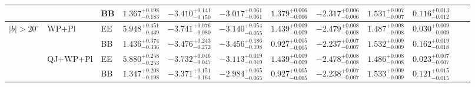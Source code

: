 \begin{table}[h]
\begin{adjustbox}{center}
{\begin{tabular}{llllcccccccc}
 &          & BB & $1.367^{+0.198}_{-0.183}$ & $-3.410^{+0.141}_{-0.150}$ & $-3.017^{+0.061}_{-0.061}$ & $1.379^{+0.006}_{-0.006}$ & $-2.317^{+0.006}_{-0.006}$ & $1.531^{+0.007}_{-0.007}$ & $0.116^{+0.013}_{-0.012}$ \\
\midrule
\multirow{4}{*}{$|b|>20^\circ$}
 & WP+Pl    & EE & $5.948^{+0.451}_{-0.439}$ & $-3.741^{+0.076}_{-0.080}$ & $-3.140^{+0.054}_{-0.055}$ & $1.439^{+0.009}_{-0.009}$ & $-2.479^{+0.008}_{-0.008}$ & $1.487^{+0.008}_{-0.008}$ & $0.030^{+0.009}_{-0.009}$ \\
 &          & BB & $1.436^{+0.374}_{-0.336}$ & $-3.476^{+0.243}_{-0.272}$ & $-3.456^{+0.186}_{-0.198}$ & $0.927^{+0.005}_{-0.005}$ & $-2.237^{+0.007}_{-0.007}$ & $1.532^{+0.009}_{-0.009}$ & $0.162^{+0.019}_{-0.018}$ \\
 & QJ+WP+Pl & EE & $5.880^{+0.258}_{-0.253}$ & $-3.732^{+0.046}_{-0.047}$ & $-3.113^{+0.019}_{-0.019}$ & $1.439^{+0.009}_{-0.009}$ & $-2.478^{+0.008}_{-0.008}$ & $1.486^{+0.008}_{-0.008}$ & $0.023^{+0.007}_{-0.007}$ \\
 &          & BB & $1.347^{+0.208}_{-0.198}$ & $-3.371^{+0.151}_{-0.164}$ & $-2.984^{+0.065}_{-0.065}$ & $0.927^{+0.005}_{-0.005}$ & $-2.238^{+0.007}_{-0.007}$ & $1.533^{+0.009}_{-0.009}$ & $0.121^{+0.015}_{-0.015}$ \\
\bottomrule
\end{tabular}}
\end{adjustbox}
\end{table}